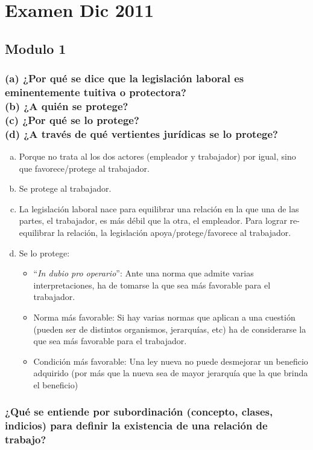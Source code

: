 \documentclass[spanish,12pt,a4paper,titlepage]{report}
\begin{document}
\chapter{Examen Dic 2011}

\section{Modulo 1}

\subsection{(a) ¿Por qué se dice que la legislación laboral es eminentemente tuitiva o protectora?\\(b) ¿A quién se protege?\\(c) ¿Por qué se lo protege?\\(d) ¿A través de qué vertientes jurídicas se lo protege?}

\begin{enumerate}[(a)]
\item Porque no trata al los dos actores (empleador y trabajador) por igual, sino que favorece/protege al trabajador.
\item Se protege al trabajador.
\item La legislación laboral nace para equilibrar una relación en la que una de las partes, el trabajador, es más débil que la otra, el empleador. Para lograr re-equilibrar la relación, la legislación apoya/protege/favorece al trabajador.
\item Se lo protege:
  \begin{itemize}
  \item ``\textit{In dubio pro operario}'': Ante una norma que admite varias interpretaciones, ha de tomarse la que sea más favorable para el trabajador.
  \item Norma más favorable: Si hay varias normas que aplican a una cuestión (pueden ser de distintos organismos, jerarquías, etc) ha de considerarse la que sea más favorable para el trabajador.
  \item Condición más favorable: Una ley nueva no puede desmejorar un beneficio adquirido (por más que la nueva sea de mayor jerarquía que la que brinda el beneficio)
  \end{itemize}
\end{enumerate}

\subsection{¿Qué se entiende por subordinación (concepto, clases, indicios) para definir la existencia de una relación de trabajo?}
\end{document}
